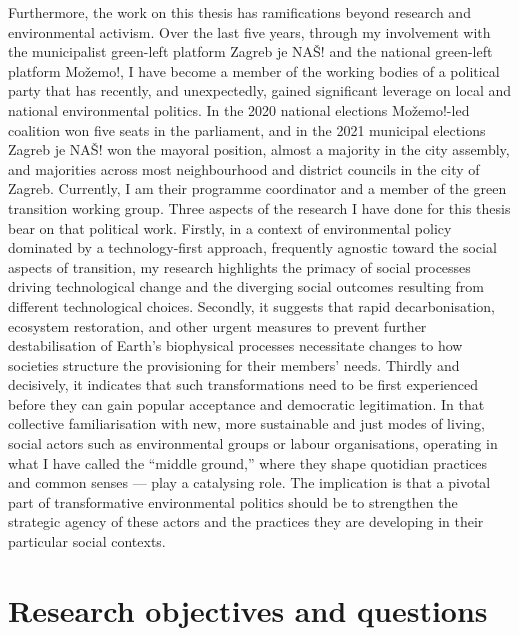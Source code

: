 \documentclass[a4paper, nobind]{templates/ociamthesis}
\begin{document}
Furthermore, the work on this thesis has ramifications beyond research and environmental activism. Over the last five years, through my involvement with the municipalist green-left platform Zagreb je NAŠ! and the national green-left platform Možemo!, I have become a member of the working bodies of a political party that has recently, and unexpectedly, gained significant leverage on local and national environmental politics. In the 2020 national elections Možemo!-led coalition won five seats in the parliament, and in the 2021 municipal elections Zagreb je NAŠ! won the mayoral position, almost a majority in the city assembly, and majorities across most neighbourhood and district councils in the city of Zagreb. Currently, I am their programme coordinator and a member of the green transition working group. Three aspects of the research I have done for this thesis bear on that political work. Firstly, in a context of environmental policy dominated by a technology-first approach, frequently agnostic toward the social aspects of transition, my research highlights the primacy of social processes driving technological change and the diverging social outcomes resulting from different technological choices. Secondly, it suggests that rapid decarbonisation, ecosystem restoration, and other urgent measures to prevent further destabilisation of Earth's biophysical processes necessitate changes to how societies structure the provisioning for their members' needs. Thirdly and decisively, it indicates that such transformations need to be first experienced before they can gain popular acceptance and democratic legitimation. In that collective familiarisation with new, more sustainable and just modes of living, social actors such as environmental groups or labour organisations, operating in what I have called the ``middle ground,'' where they shape quotidian practices and common senses --- play a catalysing role. The implication is that a pivotal part of transformative environmental politics should be to strengthen the strategic agency of these actors and the practices they are developing in their particular social contexts.

\hypertarget{research-objectives-and-questions}{%
\section{Research objectives and questions}\label{research-objectives-and-questions}}
\end{document}
